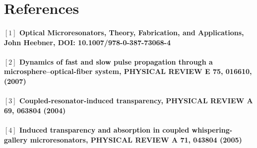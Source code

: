\newpage
\section*{References}
\paragraph{\normalfont \large $[1]$ Optical Microresonators, Theory, Fabrication, and Applications, John Heebner, DOI: 10.1007/978-0-387-73068-4\\
\\ $[2]$ Dynamics of fast and slow pulse propagation through a microsphere–optical-fiber system, PHYSICAL REVIEW E 75, 016610, (2007)\\
\\ $[3]$ Coupled-resonator-induced transparency, PHYSICAL REVIEW A 69, 063804 (2004)\\
\\ $[4]$ Induced transparency and absorption in coupled whispering-gallery microresonators, PHYSICAL REVIEW A 71, 043804 (2005)}

